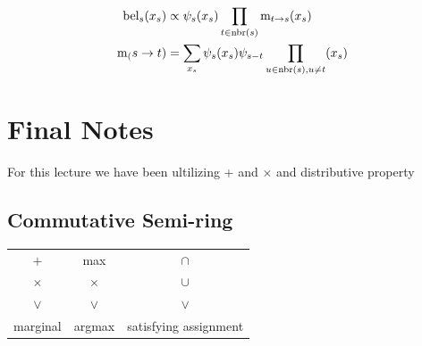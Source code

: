 \documentclass{article}
\begin{document}
\begin{align*}
\text{bel}_s(x_s)&\propto\psi_s(x_s)\prod_{t \in \text{nbr}(s)} \text{m}_{t\rightarrow s}(x_s)\\
\text{m}_(s\rightarrow t) &=\sum_{x_s}\psi_s(x_s)\psi_{s-t}\prod_{u \in \text{nbr}(s), u \neq t}(x_s)
\end{align*}
\section{Final Notes}
For this lecture we have been ultilizing + and $\times$ and distributive property
\subsection{Commutative Semi-ring}
\begin{center}
\begin{tabular}{ c c c }
$+$ & max & $\cap$\\ 
 $\times$ & $\times$& $\cup$ \\  
 $ \vee$&  $ \vee$&  $\vee$\\
 marginal & argmax & satisfying assignment    
\end{tabular}
\end{center}
\end{document}
